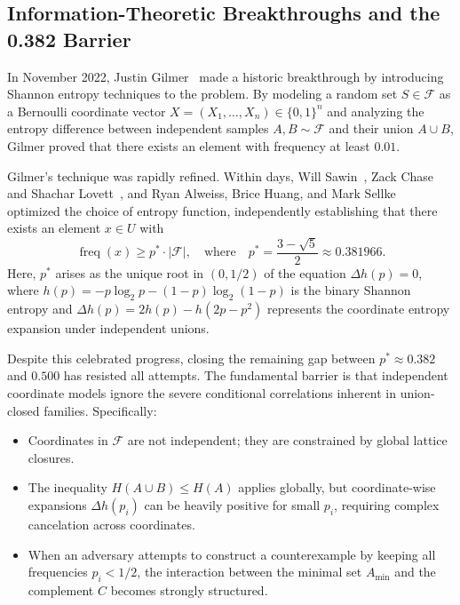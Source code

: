 \documentclass[11pt,a4paper]{article}
\theoremstyle{plain}
\theoremstyle{definition}
\theoremstyle{remark}
\newcommand{\F}{\mathcal{F}}
\newcommand{\freq}{\operatorname{freq}}
\begin{document}
\subsection{Information-Theoretic Breakthroughs and the 0.382 Barrier}

In November 2022, Justin Gilmer~\cite{gilmer2022} made a historic breakthrough by introducing Shannon entropy techniques to the problem. By modeling a random set $S \in \F$ as a Bernoulli coordinate vector $X = (X_1, \dots, X_n) \in \{0, 1\}^n$ and analyzing the entropy difference between independent samples $A, B \sim \F$ and their union $A \cup B$, Gilmer proved that there exists an element with frequency at least $0.01$.

Gilmer's technique was rapidly refined. Within days, Will Sawin~\cite{sawin2023}, Zack Chase and Shachar Lovett~\cite{chase2022}, and Ryan Alweiss, Brice Huang, and Mark Sellke~\cite{alweiss2022} optimized the choice of entropy function, independently establishing that there exists an element $x \in U$ with
\begin{equation}
\freq(x) \ge p^* \cdot |\F|, \quad \text{where} \quad p^* = \frac{3 - \sqrt{5}}{2} \approx 0.381966.
\end{equation}
Here, $p^*$ arises as the unique root in $(0, 1/2)$ of the equation $\Delta h(p) = 0$, where $h(p) = -p \log_2 p - (1-p) \log_2(1-p)$ is the binary Shannon entropy and $\Delta h(p) = 2h(p) - h(2p - p^2)$ represents the coordinate entropy expansion under independent unions.

Despite this celebrated progress, closing the remaining gap between $p^* \approx 0.382$ and $0.500$ has resisted all attempts. The fundamental barrier is that independent coordinate models ignore the severe conditional correlations inherent in union-closed families. Specifically:
\begin{itemize}
    \item Coordinates in $\F$ are not independent; they are constrained by global lattice closures.
    \item The inequality $H(A \cup B) \le H(A)$ applies globally, but coordinate-wise expansions $\Delta h(p_i)$ can be heavily positive for small $p_i$, requiring complex cancelation across coordinates.
    \item When an adversary attempts to construct a counterexample by keeping all frequencies $p_i < 1/2$, the interaction between the minimal set $A_{\min}$ and the complement $C$ becomes strongly structured.
\end{itemize}
\end{document}
